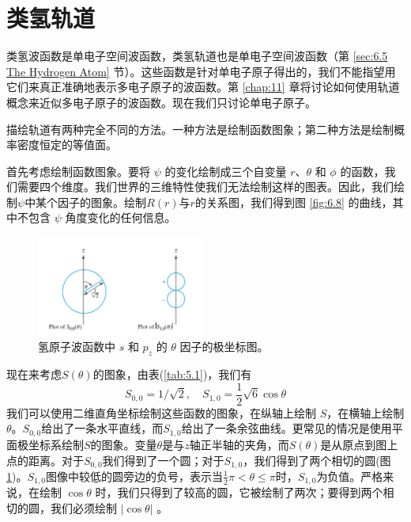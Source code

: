\section{类氢轨道}
\label{sec:6.7 Hydrogenlike orbitals}
    类氢波函数是单电子空间波函数，类氢轨道也是单电子空间波函数（第 \ref{sec:6.5 The Hydrogen Atom} 节）。这些函数是针对单电子原子得出的，我们不能指望用它们来真正准确地表示多电子原子的波函数。第 \ref{chap:11} 章将讨论如何使用轨道概念来近似多电子原子的波函数。现在我们只讨论单电子原子。

    描绘轨道有两种完全不同的方法。一种方法是绘制函数图象；第二种方法是绘制概率密度恒定的等值面。

    首先考虑绘制函数图象。要将 $\psi$ 的变化绘制成三个自变量 $r$、$\theta$ 和 $\phi$ 的函数，我们需要四个维度。我们世界的三维特性使我们无法绘制这样的图表。因此，我们绘制$\psi$中某个因子的图象。绘制$R\left(r\right)$与$r$的关系图，我们得到图 \ref{fig:6.8} 的曲线，其中不包含 $\psi$ 角度变化的任何信息。
    \begin{figure}[ht]
        \centering
        \includegraphics[width=0.5\textwidth]{Figures/6.10.png}
        \caption{氢原子波函数中 $s$ 和 $p_z$ 的 $\theta$ 因子的极坐标图。}
        \label{fig:6.10}
    \end{figure}

    现在来考虑$S\left(\theta\right)$的图象，由表(\ref{tab:5.1})，我们有
    \begin{equation*}
        S_{0,0} = 1/\sqrt{2}, \quad S_{1,0} = \frac{1}{2}\sqrt{6}\cos\theta
    \end{equation*}
    我们可以使用二维直角坐标绘制这些函数的图象，在纵轴上绘制 $S$，在横轴上绘制 $\theta$。$S_{0,0}$给出了一条水平直线，而$S_{1,0}$给出了一条余弦曲线。更常见的情况是使用平面极坐标系绘制$S$的图象。变量$\theta$是与$z$轴正半轴的夹角，而$S\left(\theta\right)$是从原点到图上点的距离。对于$S_{0,0}$我们得到了一个圆；对于$S_{1,0}$，我们得到了两个相切的圆(图\ref{fig:6.10})。$S_{1,0}$图像中较低的圆旁边的负号，表示当$\frac{1}{2}\pi < \theta \leq \pi$时，$S_{1,0}$为负值。严格来说，在绘制 $\cos\theta$ 时，我们只得到了较高的圆，它被绘制了两次；要得到两个相切的圆，我们必须绘制 $\left|\cos\theta\right|$ 。

